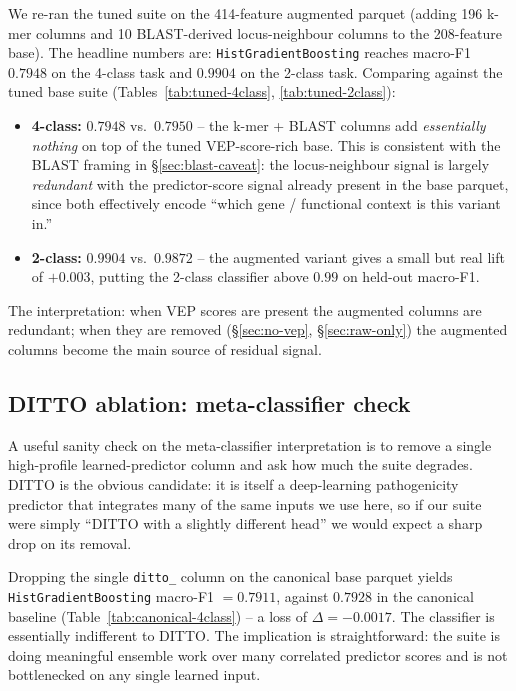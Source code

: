 \documentclass[11pt,a4paper]{article}
\begin{document}
We re-ran the tuned suite on the 414-feature augmented parquet (adding 196
k-mer columns and 10 BLAST-derived locus-neighbour columns to the 208-feature
base). The headline numbers are: \texttt{HistGradientBoosting} reaches
macro-F1 $0.7948$ on the 4-class task and $\mathbf{0.9904}$ on the 2-class task.
Comparing against the tuned base suite (Tables~\ref{tab:tuned-4class},
\ref{tab:tuned-2class}):
\begin{itemize}[leftmargin=*]
    \item \textbf{4-class:} $0.7948$ vs.\ $0.7950$ -- the k-mer + BLAST columns
          add \emph{essentially nothing} on top of the tuned VEP-score-rich
          base. This is consistent with the BLAST framing in
          \S\ref{sec:blast-caveat}: the locus-neighbour signal is largely
          \emph{redundant} with the predictor-score signal already present in
          the base parquet, since both effectively encode ``which gene /
          functional context is this variant in.''
    \item \textbf{2-class:} $0.9904$ vs.\ $0.9872$ -- the augmented variant
          gives a small but real lift of $+0.003$, putting the 2-class
          classifier above $0.99$ on held-out macro-F1.
\end{itemize}
The interpretation: when VEP scores are present the augmented columns are
redundant; when they are removed (\S\ref{sec:no-vep}, \S\ref{sec:raw-only})
the augmented columns become the main source of residual signal.

\subsection{DITTO ablation: meta-classifier check}
\label{sec:ditto}

A useful sanity check on the meta-classifier interpretation is to remove a
single high-profile learned-predictor column and ask how much the suite
degrades. DITTO is the obvious candidate: it is itself a deep-learning
pathogenicity predictor that integrates many of the same inputs we use here,
so if our suite were simply ``DITTO with a slightly different head'' we
would expect a sharp drop on its removal.

Dropping the single \texttt{ditto\_} column on the canonical base parquet
yields \texttt{HistGradientBoosting} macro-F1 $= 0.7911$, against
$0.7928$ in the canonical baseline (Table~\ref{tab:canonical-4class}) -- a
loss of $\Delta = -0.0017$. The classifier is essentially indifferent to
DITTO. The implication is straightforward: the suite is doing meaningful
ensemble work over many correlated predictor scores and is not bottlenecked
on any single learned input.
\end{document}

